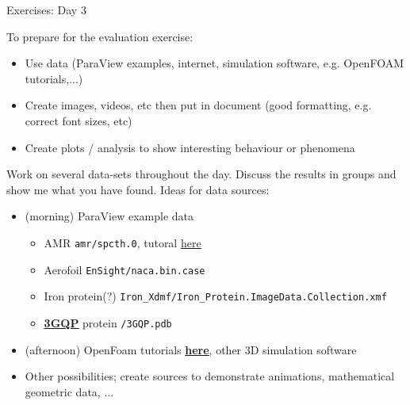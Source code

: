 \documentclass{beamer}
\begin{document}
\begin{frame}{Exercises: Day 3}

\small

To prepare for the evaluation exercise:
\begin{itemize}
    \item Use data (ParaView examples, internet, simulation software, e.g. OpenFOAM tutorials,...)
    \item Create images, videos, etc then put in document (good formatting, e.g. correct font sizes, etc)
    \item Create plots / analysis to show interesting behaviour or phenomena
\end{itemize}{}

Work on several data-sets throughout the day. Discuss the results in groups and show me what you have found. Ideas for data sources:
\begin{itemize}
    \item (morning) ParaView example data
    \begin{itemize}
        \item AMR {\tiny\texttt{amr/spcth.0}, tutoral \href{https://docs.paraview.org/en/latest/Tutorials/ClassroomTutorials/targetedParaViewAndCTH.html#targeted-paraview-cth}{\underline{here}}}
        \item Aerofoil {\tiny\texttt{EnSight/naca.bin.case}}
        \item Iron protein(?) {\tiny\texttt{Iron\_Xdmf/Iron\_Protein.ImageData.Collection.xmf}}
        \item \href{https://www.rcsb.org/structure/3GQP}{\bf\underline{3GQP}} protein {\tiny\texttt{/3GQP.pdb}}
    \end{itemize}{}
    \item (afternoon) OpenFoam tutorials \href{https://www.openfoam.com/documentation/tutorial-guide/}{\bf\underline{here}}, other 3D simulation software
    \item Other possibilities; create sources to demonstrate animations, mathematical geometric data, ...
\end{itemize}{}

\end{frame}{}
\end{document}
